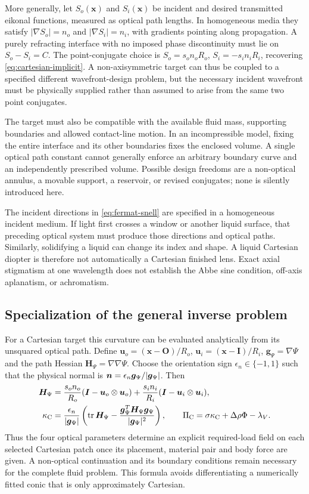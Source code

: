 More generally, let $S_o(\bm x)$ and $S_i(\bm x)$ be incident and desired
transmitted eikonal functions, measured as optical path lengths. In homogeneous
media they satisfy $|\nabla S_o|=n_o$ and $|\nabla S_i|=n_i$, with gradients
pointing along propagation. A purely refracting interface with no imposed
phase discontinuity must lie on $S_o-S_i=C$. The point-conjugate choice is
$S_o=s_on_oR_o$, $S_i=-s_in_iR_i$, recovering
\cref{eq:cartesian-implicit}. A non-axisymmetric target can thus be coupled to
a specified different wavefront-design problem, but the necessary incident
wavefront must be physically supplied rather than assumed to arise from the
same two point conjugates.

The target must also be compatible with the available fluid mass, supporting
boundaries and allowed contact-line motion. In an incompressible model, fixing
the entire interface and its other boundaries fixes the enclosed volume. A
single optical path constant cannot generally enforce an arbitrary boundary
curve and an independently prescribed volume. Possible design freedoms are a
non-optical annulus, a movable support, a reservoir, or revised conjugates; none
is silently introduced here.

The incident directions in \cref{eq:fermat-snell} are specified in a homogeneous
incident medium. If light first crosses a window or another liquid surface,
that preceding optical system must produce those directions and optical paths.
Similarly, solidifying a liquid can change its index and shape. A liquid
Cartesian diopter is therefore not automatically a Cartesian finished lens.
Exact axial stigmatism at one wavelength does not establish the Abbe sine
condition, off-axis aplanatism, or achromatism.

\subsection{Specialization of the general inverse problem}
For a Cartesian target this curvature can be evaluated analytically from its
unsquared optical path. Define $\bm u_o=(\bm x-\bm O)/R_o$,
$\bm u_i=(\bm x-\bm I)/R_i$, $\bm g_\Psi=\nabla\Psi$ and the path Hessian
$\bm H_\Psi=\nabla\nabla\Psi$. Choose the orientation sign
$\epsilon_n\in\{-1,1\}$ such that the physical normal is
$\bm n=\epsilon_n\bm g_\Psi/|\bm g_\Psi|$. Then
\begin{align}
 \bm H_\Psi&=\frac{s_on_o}{R_o}(\bm I-\bm u_o\otimes\bm u_o)
            +\frac{s_in_i}{R_i}(\bm I-\bm u_i\otimes\bm u_i),\\
 \kappa_{\rm C}&=\frac{\epsilon_n}{|\bm g_\Psi|}
 \left(\operatorname{tr}\bm H_\Psi-
       \frac{\bm g_\Psi^T\bm H_\Psi\bm g_\Psi}{|\bm g_\Psi|^2}\right),
 \qquad
 \Pi_{\rm C}=\sigma\kappa_{\rm C}+\Delta\rho\Phi-\lambda_V.
 \label{eq:cartesian-traction-explicit}
\end{align}
Thus the four optical parameters determine an explicit required-load field on
each selected Cartesian patch once its placement, material pair and body
force are given. A non-optical continuation and its boundary conditions remain
necessary for the complete fluid problem. This formula avoids differentiating
a numerically fitted conic that is only approximately Cartesian.


